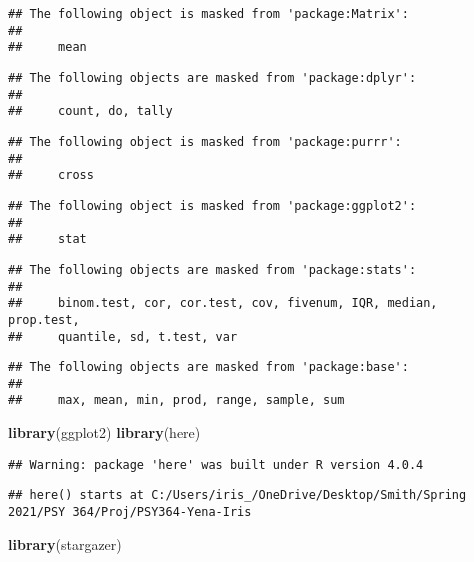 \documentclass[
]{article}
\newenvironment{Shaded}{\begin{snugshade}}{\end{snugshade}}
\newcommand{\KeywordTok}[1]{\textcolor[rgb]{0.13,0.29,0.53}{\textbf{#1}}}
\newcommand{\NormalTok}[1]{#1}
\begin{document}
\begin{verbatim}
## The following object is masked from 'package:Matrix':
## 
##     mean
\end{verbatim}

\begin{verbatim}
## The following objects are masked from 'package:dplyr':
## 
##     count, do, tally
\end{verbatim}

\begin{verbatim}
## The following object is masked from 'package:purrr':
## 
##     cross
\end{verbatim}

\begin{verbatim}
## The following object is masked from 'package:ggplot2':
## 
##     stat
\end{verbatim}

\begin{verbatim}
## The following objects are masked from 'package:stats':
## 
##     binom.test, cor, cor.test, cov, fivenum, IQR, median, prop.test,
##     quantile, sd, t.test, var
\end{verbatim}

\begin{verbatim}
## The following objects are masked from 'package:base':
## 
##     max, mean, min, prod, range, sample, sum
\end{verbatim}

\begin{Shaded}
\begin{Highlighting}[]
\KeywordTok{library}\NormalTok{(ggplot2)}
\KeywordTok{library}\NormalTok{(here)}
\end{Highlighting}
\end{Shaded}

\begin{verbatim}
## Warning: package 'here' was built under R version 4.0.4
\end{verbatim}

\begin{verbatim}
## here() starts at C:/Users/iris_/OneDrive/Desktop/Smith/Spring 2021/PSY 364/Proj/PSY364-Yena-Iris
\end{verbatim}

\begin{Shaded}
\begin{Highlighting}[]
\KeywordTok{library}\NormalTok{(stargazer)}
\end{Highlighting}
\end{Shaded}
\end{document}
